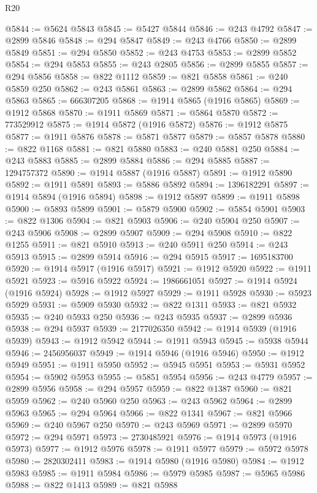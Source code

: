 \begin{lexlean}{R20}
\begin{coremodule}
{@5844 := @5624 @5843
@5845 := @5427 @5844
@5846 := @243 @4792
@5847 := @2899 @5846
@5848 := @294 @5847
@5849 := @243 @4766
@5850 := @2899 @5849
@5851 := @294 @5850
@5852 := @243 @4753
@5853 := @2899 @5852
@5854 := @294 @5853
@5855 := @243 @2805
@5856 := @2899 @5855
@5857 := @294 @5856
@5858 := @822 @1112
@5859 := @821 @5858
@5861 := @240 @5859 @250
@5862 := @243 @5861
@5863 := @2899 @5862
@5864 := @294 @5863
@5865 := 666307205
@5868 := @1914 @5865 (@1916 @5865)
@5869 := @1912 @5868
@5870 := @1911 @5869
@5871 := @5864 @5870
@5872 := 773529912
@5875 := @1914 @5872 (@1916 @5872)
@5876 := @1912 @5875
@5877 := @1911 @5876
@5878 := @5871 @5877
@5879 := @5857 @5878
@5880 := @822 @1168
@5881 := @821 @5880
@5883 := @240 @5881 @250
@5884 := @243 @5883
@5885 := @2899 @5884
@5886 := @294 @5885
@5887 := 1294757372
@5890 := @1914 @5887 (@1916 @5887)
@5891 := @1912 @5890
@5892 := @1911 @5891
@5893 := @5886 @5892
@5894 := 1396182291
@5897 := @1914 @5894 (@1916 @5894)
@5898 := @1912 @5897
@5899 := @1911 @5898
@5900 := @5893 @5899
@5901 := @5879 @5900
@5902 := @5854 @5901
@5903 := @822 @1306
@5904 := @821 @5903
@5906 := @240 @5904 @250
@5907 := @243 @5906
@5908 := @2899 @5907
@5909 := @294 @5908
@5910 := @822 @1255
@5911 := @821 @5910
@5913 := @240 @5911 @250
@5914 := @243 @5913
@5915 := @2899 @5914
@5916 := @294 @5915
@5917 := 1695183700
@5920 := @1914 @5917 (@1916 @5917)
@5921 := @1912 @5920
@5922 := @1911 @5921
@5923 := @5916 @5922
@5924 := 1986661051
@5927 := @1914 @5924 (@1916 @5924)
@5928 := @1912 @5927
@5929 := @1911 @5928
@5930 := @5923 @5929
@5931 := @5909 @5930
@5932 := @822 @1311
@5933 := @821 @5932
@5935 := @240 @5933 @250
@5936 := @243 @5935
@5937 := @2899 @5936
@5938 := @294 @5937
@5939 := 2177026350
@5942 := @1914 @5939 (@1916 @5939)
@5943 := @1912 @5942
@5944 := @1911 @5943
@5945 := @5938 @5944
@5946 := 2456956037
@5949 := @1914 @5946 (@1916 @5946)
@5950 := @1912 @5949
@5951 := @1911 @5950
@5952 := @5945 @5951
@5953 := @5931 @5952
@5954 := @5902 @5953
@5955 := @5851 @5954
@5956 := @243 @4779
@5957 := @2899 @5956
@5958 := @294 @5957
@5959 := @822 @1387
@5960 := @821 @5959
@5962 := @240 @5960 @250
@5963 := @243 @5962
@5964 := @2899 @5963
@5965 := @294 @5964
@5966 := @822 @1341
@5967 := @821 @5966
@5969 := @240 @5967 @250
@5970 := @243 @5969
@5971 := @2899 @5970
@5972 := @294 @5971
@5973 := 2730485921
@5976 := @1914 @5973 (@1916 @5973)
@5977 := @1912 @5976
@5978 := @1911 @5977
@5979 := @5972 @5978
@5980 := 2820302411
@5983 := @1914 @5980 (@1916 @5980)
@5984 := @1912 @5983
@5985 := @1911 @5984
@5986 := @5979 @5985
@5987 := @5965 @5986
@5988 := @822 @1413
@5989 := @821 @5988
}
\end{coremodule}
\end{lexlean}
